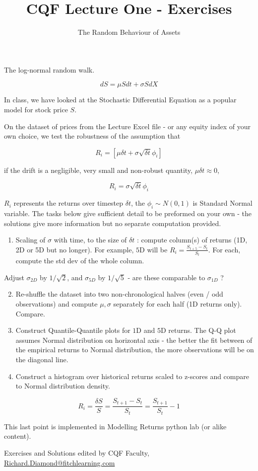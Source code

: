 \documentclass[10pt]{article}
\title{CQF Lecture One - Exercises }
\author{The Random Behaviour of Assets}
\date{}
\begin{document}
\maketitle
The log-normal random walk.

$$
d S=\mu S d t+\sigma S d X
$$

In class, we have looked at the Stochastic Differential Equation as a popular model for stock price $S$.

On the dataset of prices from the Lecture Excel file - or any equity index of your own choice, we test the robustness of the assumption that

$$
R_{i}=\left[\mu \delta t+\sigma \sqrt{\delta t} \phi_{i}\right]
$$

if the drift is a negligible, very small and non-robust quantity, $\mu \delta t \approx 0$,

$$
R_{i}=\sigma \sqrt{\delta t} \phi_{i}
$$

$R_{i}$ represents the returns over timestep $\delta t$, the $\phi_{i} \sim N(0,1)$ is Standard Normal variable. The tasks below give sufficient detail to be preformed on your own - the solutions give more information but no separate computation provided.

\begin{enumerate}
  \item Scaling of $\sigma$ with time, to the size of $\delta t$ : compute column(s) of returns (1D, 2D or 5D but no longer). For example, $5 \mathrm{D}$ will be $R_{i}=\frac{S_{t+5}-S_{t}}{S_{t}}$. For each, compute the std dev of the whole column.
\end{enumerate}

Adjust $\sigma_{2 D}$ by $1 / \sqrt{2}$, and $\sigma_{5 D}$ by $1 / \sqrt{5}$ - are these comparable to $\sigma_{1 D}$ ?

\begin{enumerate}
  \setcounter{enumi}{1}
  \item Re-shuffle the dataset into two non-chronological halves (even / odd observations) and compute $\mu, \sigma$ separately for each half (1D returns only). Compare.

  \item Construct Quantile-Quantile plots for $1 \mathrm{D}$ and $5 \mathrm{D}$ returns. The Q-Q plot assumes Normal distribution on horizontal axis - the better the fit between of the empirical returns to Normal distribution, the more observations will be on the diagonal line.

  \item Construct a histogram over historical returns scaled to z-scores and compare to Normal distribution density.

\end{enumerate}

$$
R_{i}=\frac{\delta S}{S}=\frac{S_{t+1}-S_{t}}{S_{t}}=\frac{S_{t+1}}{S_{t}}-1
$$

This last point is implemented in Modelling Returns python lab (or alike content).

Exercises and Solutions edited by CQF Faculty, \href{mailto:Richard.Diamond@fitchlearning.com}{Richard.Diamond@fitchlearning.com}
\end{document}

